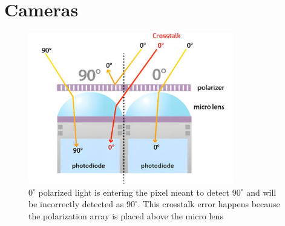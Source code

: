 \chapter{Cameras}



\begin{figure}
    \centering
    \includegraphics[width=0.8\textwidth]{figures/crosstalk_upscaled.jpg}
    \caption{$0^{\circ}$ polarized light is entering the pixel meant to detect $90^{\circ}$ and will be incorrectly detected as $90^{\circ}$.  This crosstalk error happens because the polarization array is placed above the micro lens \cite{lucidvisionlabsPolarizationExplainedSony2018}}
    \label{fig:camera_crosstalk}
\end{figure}


